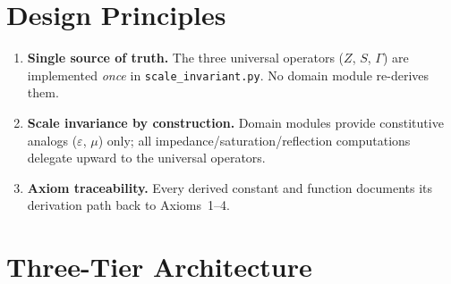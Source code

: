 \section{Design Principles}

\begin{enumerate}
    \item \textbf{Single source of truth.}  The three universal operators
          ($Z$, $S$, $\Gamma$) are implemented \emph{once} in
          \texttt{scale\_invariant.py}.  No domain module re-derives them.
    \item \textbf{Scale invariance by construction.}  Domain modules
          provide constitutive analogs ($\varepsilon$, $\mu$) only;
          all impedance/saturation/reflection computations delegate
          upward to the universal operators.
    \item \textbf{Axiom traceability.}  Every derived constant and
          function documents its derivation path back to Axioms~1--4.
\end{enumerate}


\section{Three-Tier Architecture}

